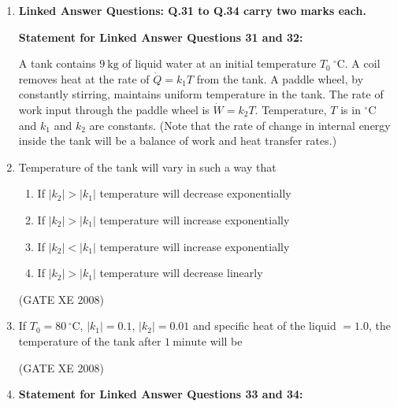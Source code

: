 \documentclass[12pt]{article}
\begin{document}
\begin{enumerate}
 (GATE XE 2008)  

\item[] \textbf{\Large Linked Answer Questions: Q.31 to Q.34 carry two marks each.}

\textbf{Statement for Linked Answer Questions 31 and 32:}  

A tank contains $9~\mathrm{kg}$ of liquid water at an initial temperature $T_0~^{\circ}\mathrm{C}$.  
A coil removes heat at the rate of $\dot{Q} = k_1 T$ from the tank. A paddle wheel, by constantly stirring, maintains uniform temperature in the tank.  
The rate of work input through the paddle wheel is $\dot{W} = k_2 T$. Temperature, $T$ is in $^{\circ}\mathrm{C}$ and $k_1$ and $k_2$ are constants.  
(Note that the rate of change in internal energy inside the tank will be a balance of work and heat transfer rates.)  

\item Temperature of the tank will vary in such a way that  

\begin{enumerate}
\item  If $|k_2| > |k_1|$ temperature will decrease exponentially  
\item  If $|k_2| > |k_1|$ temperature will increase exponentially  
\item  If $|k_2| < |k_1|$ temperature will increase exponentially  
\item  If $|k_2| > |k_1|$ temperature will decrease linearly  
\end{enumerate}

(GATE XE 2008)  

\item If $T_0 = 80\,^{\circ}\mathrm{C}$, $|k_1| = 0.1$, $|k_2| = 0.01$ and specific heat of the liquid $= 1.0$, the temperature of the tank after $1~\mathrm{minute}$ will be  

\begin{enumerate}
\end{enumerate}

(GATE XE 2008)  

\item[] \textbf{Statement for Linked Answer Questions 33 and 34:}  


\end{enumerate}
\end{document}
